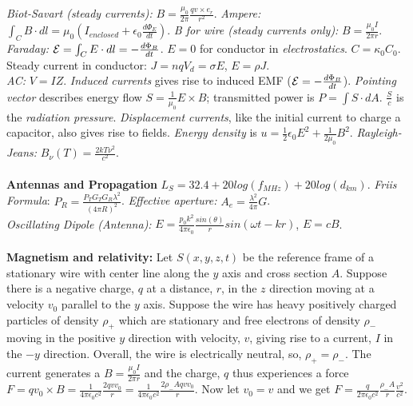 \emph{Biot-Savart (steady currents):}
$B= {\frac {\mu_0} {2 \pi}} {\frac {qv \times e_r} {r^2}}$.
\emph{Ampere:} $\int_C B \cdot dl = \mu_0 (I_{enclosed}+\epsilon_0 {\frac {d \Phi_E}{dt}})$.
\emph{B for wire (steady currents only):} $B= {\frac {\mu_0 I} {2 \pi r}}$.  
\emph{Faraday:} ${\cal E}= \int_C E \cdot dl= - {\frac {d \Phi_B} {dt}}$.
$E= 0$ for conductor in \emph{electrostatics}.
$C=\kappa_0 C_0$.  Steady current in conductor: $J= nqV_d= \sigma E$, $E=\rho J$.\\
\emph{AC:} $V=IZ$. \emph{Induced currents} gives rise to induced 
EMF (${\cal E}= -{\frac {d \Phi_B} {dt}}$).
\emph{Pointing vector} describes energy flow 
$S= {\frac 1 {\mu_0}} E \times B$; transmitted power
is $P= \int S \cdot dA$.  ${\frac S c}$ is the \emph{radiation pressure}.  
\emph{Displacement currents},
like the initial current to charge a capacitor, also gives rise to fields.  
\emph{Energy density} is
$u= {\frac 1 2} \epsilon_0 E^2 + {\frac 1 {2 \mu_0}} B^2$.
\emph{Rayleigh-Jeans:} $B_{\nu}(T)= {\frac {2kT \nu^2}{c^2}}$.
\\
\\
{\bf Antennas and Propagation}
$L_S = 32.4 + 20 log(f_{MHz}) + 20 log(d_{km})$.  \emph{Friis Formula}:
$P_R = {\frac {P_T G_T G_R \lambda^2} {(4 \pi R)^2}}$.  \emph{Effective aperture:} 
$A_e = {\frac {\lambda^2} {4 \pi}}G$.
\\
\emph{Oscillating Dipole (Antenna):}
$E= {\frac {p_0 k^2} {4 \pi \epsilon_0}}
{\frac {sin( \theta )} {r}} sin(\omega t - k r)$, $E=cB$.  
\\
\\
{\bf Magnetism and relativity:}  Let $S(x,y,z,t)$ be the reference frame of a stationary
wire with center line along the $y$ axis and cross section $A$.  Suppose there is a
negative charge, $q$ at a distance, $r$, in the $z$ direction moving at a velocity $v_0$ parallel to the $y$
axis. Suppose the wire has 
heavy positively charged particles of density $\rho_{+}$ which are stationary and
free electrons of density $\rho_{-}$ moving in the positive $y$ direction with velocity, 
$v$, giving rise to a current, $I$ in the
$-y$ direction.  Overall, the wire is electrically neutral, so, $\rho_{+}= \rho_{-}$.
The current generates a $B= {\frac {\mu_0 I} {2 \pi r}}$ and the charge, $q$ thus experiences a force
$F= q v_0 \times B
=  {\frac 1 {4 \pi \epsilon_0 c^2}} {\frac {2q v v_0} {r}}
=  {\frac 1 {4 \pi \epsilon_0 c^2}} {\frac {2 \rho_- A q v v_0} {r}}$.  Now let $v_0=v$ and we get
$F= {\frac q {2 \pi \epsilon_0 c^2}} {\frac {\rho_- A} {r}} {\frac {v^2}{c^2}}$. 
